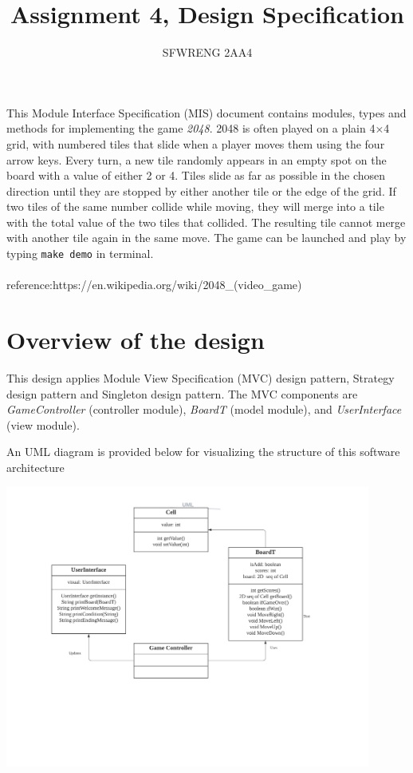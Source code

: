 \documentclass[12pt]{article}
\title{Assignment 4, Design Specification}
\author{SFWRENG 2AA4}
\begin{document}
\maketitle
This Module Interface Specification (MIS) document contains modules, types and
methods for implementing the game \textit{2048}. 2048 is often played on a plain 4×4 grid, with numbered tiles that slide when a player moves them using the four arrow keys.
Every turn, a new tile randomly appears in an empty spot on the board with a value of either 2 or 4. 
Tiles slide as far as possible in the chosen direction until they are stopped by either another tile or the edge of the grid. If two tiles of the same number collide while moving, they will merge into a tile with the total value of the two tiles that collided.
The resulting tile cannot merge with another tile again in the same move.  The 
game can be launched and play by typing \texttt{make demo} in terminal.
\\\\
reference:https://en.wikipedia.org/wiki/2048_(video_game)


\newpage

\section{Overview of the design}

This design applies Module View Specification (MVC) design pattern, Strategy design pattern and Singleton design pattern. The MVC components
are \textit{GameController} (controller module), \textit{BoardT} (model module), and \textit{UserInterface} (view module).
\bigskip

\noindent An UML diagram is provided below for visualizing the structure of this software architecture

\includegraphics[width=0.9\textwidth]{UML.png}
\end{document}
